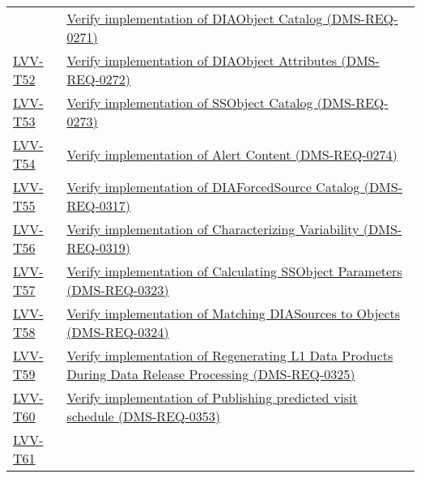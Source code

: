 \begin{longtable}[]{p{3cm}p{13cm}}
&
\href{https://jira.lsstcorp.org/secure/Tests.jspa\#/testCase/LVV-T51}{Verify
implementation of DIAObject Catalog (DMS-REQ-0271)}\tabularnewline
\protect\hyperlink{lvv-t52---verify-implementation-of-diaobject-attributes-dms-req-0272}{LVV-T52}
&
\href{https://jira.lsstcorp.org/secure/Tests.jspa\#/testCase/LVV-T52}{Verify
implementation of DIAObject Attributes (DMS-REQ-0272)}\tabularnewline
\protect\hyperlink{lvv-t53---verify-implementation-of-ssobject-catalog-dms-req-0273}{LVV-T53}
&
\href{https://jira.lsstcorp.org/secure/Tests.jspa\#/testCase/LVV-T53}{Verify
implementation of SSObject Catalog (DMS-REQ-0273)}\tabularnewline
\protect\hyperlink{lvv-t54---verify-implementation-of-alert-content-dms-req-0274}{LVV-T54}
&
\href{https://jira.lsstcorp.org/secure/Tests.jspa\#/testCase/LVV-T54}{Verify
implementation of Alert Content (DMS-REQ-0274)}\tabularnewline
\protect\hyperlink{lvv-t55---verify-implementation-of-diaforcedsource-catalog-dms-req-0317}{LVV-T55}
&
\href{https://jira.lsstcorp.org/secure/Tests.jspa\#/testCase/LVV-T55}{Verify
implementation of DIAForcedSource Catalog (DMS-REQ-0317)}\tabularnewline
\protect\hyperlink{lvv-t56---verify-implementation-of-characterizing-variability-dms-req-0319}{LVV-T56}
&
\href{https://jira.lsstcorp.org/secure/Tests.jspa\#/testCase/LVV-T56}{Verify
implementation of Characterizing Variability
(DMS-REQ-0319)}\tabularnewline
\protect\hyperlink{lvv-t57---verify-implementation-of-calculating-ssobject-parameters-dms-req-0323}{LVV-T57}
&
\href{https://jira.lsstcorp.org/secure/Tests.jspa\#/testCase/LVV-T57}{Verify
implementation of Calculating SSObject Parameters
(DMS-REQ-0323)}\tabularnewline
\protect\hyperlink{lvv-t58---verify-implementation-of-matching-diasources-to-objects-dms-req-0324}{LVV-T58}
&
\href{https://jira.lsstcorp.org/secure/Tests.jspa\#/testCase/LVV-T58}{Verify
implementation of Matching DIASources to Objects
(DMS-REQ-0324)}\tabularnewline
\protect\hyperlink{lvv-t59---verify-implementation-of-regenerating-l1-data-products-during-data-release-processing-dms-req-0325}{LVV-T59}
&
\href{https://jira.lsstcorp.org/secure/Tests.jspa\#/testCase/LVV-T59}{Verify
implementation of Regenerating L1 Data Products During Data Release
Processing (DMS-REQ-0325)}\tabularnewline
\protect\hyperlink{lvv-t60---verify-implementation-of-publishing-predicted-visit-schedule-dms-req-0353}{LVV-T60}
&
\href{https://jira.lsstcorp.org/secure/Tests.jspa\#/testCase/LVV-T60}{Verify
implementation of Publishing predicted visit schedule
(DMS-REQ-0353)}\tabularnewline
\protect\hyperlink{lvv-t61---verify-implementation-of-associate-sources-to-objects--dms-req-0034}{LVV-T61}

\end{longtable}
